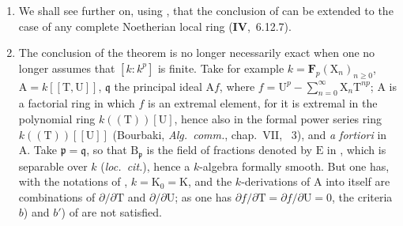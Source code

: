 \begin{remark}[22.7.7]
\label{0.22.7.7}
\begin{enumerate}
  \item[\rm{(i)}] We shall see further on, using , that the conclusion of  can be extended to the case of any complete Noetherian local ring (\textbf{IV},~6.12.7).
  \item[\rm{(ii)}] The conclusion of the theorem  is no longer necessarily exact when one no longer assumes that $[k:k^p]$ is finite.
  Take for example $k=\mathbf{F}_p(\mathrm{X}_n)_{n\geq 0}$, $\mathrm{A}=k[[\mathrm{T},\mathrm{U}]]$, $\mathfrak{q}$ the principal ideal $\mathrm{A}f$, where $f=\mathrm{U}^p-\sum_{n=0}^\infty\mathrm{X}_n\mathrm{T}^{np}$; $\mathrm{A}$ is a factorial ring in which $f$ is an extremal element, for it is extremal in the polynomial ring $k((\mathrm{T}))[\mathrm{U}]$, hence also in the formal power series ring $k((\mathrm{T}))[[\mathrm{U}]]$ (Bourbaki, \emph{Alg.~comm.}, chap.~VII, \textsection~3), and \emph{a fortiori} in $\mathrm{A}$.
  Take $\mathfrak{p}=\mathfrak{q}$, so that $\mathrm{B}_\mathfrak{p}$ is the field of fractions denoted by $\mathrm{E}$ in , which is separable over $k$ (\emph{loc.~cit.}), hence a $k$-algebra formally smooth.
  But one has, with the notations of , $k=\mathrm{K}_0=\mathrm{K}$, and the $k$-derivations of $\mathrm{A}$ into itself are combinations of $\partial/\partial\mathrm{T}$ and $\partial/\partial\mathrm{U}$; as one has $\partial f/\partial\mathrm{T}=\partial f/\partial\mathrm{U}=0$, the criteria $b$) and $b'$) of  are not satisfied.
\end{enumerate}
\end{remark}
